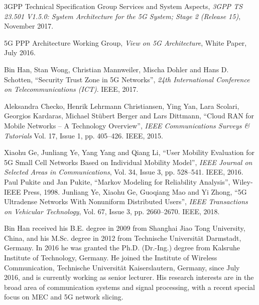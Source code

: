 \documentclass{ieeeaccess}
\newcommand{\change}[1]{#1}
\begin{document}
\begin{thebibliography}{1}
		3GPP Technical Specification Group Services and System Aspects, \emph{3GPP TS 23.501 V1.5.0: System Architecture for the 5G System; Stage 2 (Release 15)}, November 2017.
		
		5G PPP Architecture Working Group, \emph{View on 5G Architecture}, White Paper, July 2016.
		
		Bin Han, Stan Wong, Christian Mannweiler, Mischa Dohler and Hans D. Schotten, ``Security Trust Zone in 5G Networks'', \emph{24th International Conference on Telecommunications (ICT)}. IEEE, 2017.
		
		
		Aleksandra Checko, Henrik Lehrmann Christiansen, Ying Yan, Lara Scolari, Georgios Kardaras, Michael St\"ubert Berger and Lars Dittmann, ``Cloud RAN for Mobile Networks -- A Technology Overview'', \emph{IEEE Communications Surveys \& Tutorials} Vol. 17, Issue 1, pp. 405--426. IEEE, 2015.
		
		Xiaohu Ge, Junliang Ye, Yang Yang and Qiang Li, ``User Mobility Evaluation for 5G Small Cell Networks Based on Individual Mobility Model'', \emph{IEEE Journal on Selected Areas in Communications}, Vol. 34, Issue 3, pp. 528--541. IEEE, 2016.		
		\change{
		Paul Pukite and Jan Pukite, ``Markov Modeling for Reliability Analysis'', Wiley-IEEE Press, 1998.}
		\change{
		Junliang Ye, Xiaohu Ge, Guoqiang Mao and Yi Zhong, ``5G Ultradense Networks With Nonuniform Distributed Users'',\emph{ IEEE Transactions on Vehicular Technology}, Vol. 67, Issue 3, pp. 2660--2670. IEEE, 2018.
		}
		
		
	\end{thebibliography}
	
   \vfill
   \begin{IEEEbiography}[{\texttt{[image: bh]}}]{Bin Han}
   	received his B.E. degree in 2009 from Shanghai Jiao Tong University, China, and his M.Sc. degree in 2012 from Technische Universit\"at Darmstadt, Germany. In 2016 he was granted the Ph.D. (Dr.-Ing.) degree from Kalsruhe Institute of Technology, Germany. He joined the Institute of Wireless Communication, Technische Universit\"at Kaiserslautern, Germany, since July 2016, and is currently working as senior lecturer. His research interests are in the broad area of communication systems and signal processing\change{, with a recent special focus on MEC and 5G network slicing}.
   \end{IEEEbiography}
   
\end{document}
